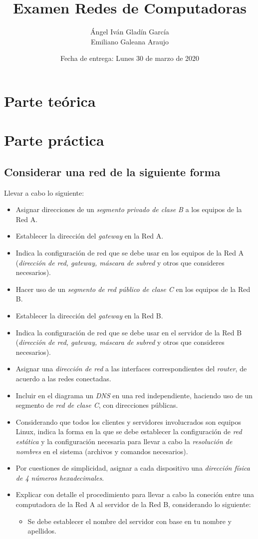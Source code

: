 \documentclass[spanish,12pt,letterpaper]{article}
\title{Examen Redes de Computadoras}
\author{Ángel Iván Gladín García\\
  Emiliano Galeana Araujo}
\affil{Facultad de ciencias, UNAM}
\date{Fecha de entrega: Lunes 30 de marzo de 2020}
\begin{document}
\maketitle

\section{Parte teórica}

\section{Parte práctica}
\subsection{Considerar una red de la siguiente forma}
Llevar a cabo lo siguiente:
\begin{itemize}
\item Asignar direcciones de un \textit{segmento privado de clase B} a los
  equipos de la Red A.
\item Establecer la dirección del \textit{gateway} en la Red A.
\item Indica la configuración de red que se debe usar en los equipos de la Red A
  (\textit{dirección de red, gateway, máscara de subred} y otros que consideres
  necesarios).
\item Hacer uso de un \textit{segmento de red público de clase C} en los equipos
  de la Red B.
\item Establecer la dirección del \textit{gateway} en la Red B.
\item Indica la configuración de red que se debe usar en el servidor de la Red B
  (\textit{dirección de red, gateway, máscara de subred} y otros que consideres
  necesarios).
\item Asignar una \textit{dirección de red} a las interfaces correspondientes del
  \textit{router}, de acuerdo a las redes conectadas.
\item Incluir en el diagrama un \textit{DNS} en una red independiente, haciendo
  uso de un segmento de \textit{red de clase C}, con direcciones públicas.
\item Considerando que todos los clientes y servidores involucrados son equipos
  Linux, indica la forma en la que se debe establecer la configuración de
  \textit{red estática} y la configuración necesaria para llevar a cabo la
  \textit{resolución de nombres} en el sistema (archivos y comandos necesarios).
\item Por cuestiones de simplicidad, asignar a cada dispositivo  una
  \textit{dirección física de 4 números hexadecimales}.
\item Explicar con detalle el procedimiento para llevar a cabo la coneción entre
  una computadora de la Red A al servidor de la Red B, considerando lo siguiente:
  \begin{itemize}
  \item Se debe establecer el nombre del servidor con base en tu nombre y
    apellidos.
    

\end{itemize}
\end{itemize}
\end{document}
